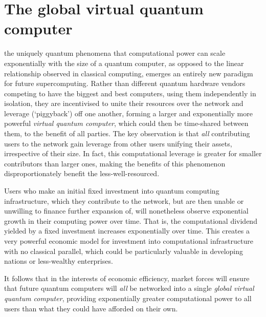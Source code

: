 \section{The global virtual quantum computer} \label{sec:GVQC} 

\newline

 the uniquely quantum phenomena that computational power can scale exponentially with the size of a quantum computer, as opposed to the linear relationship observed in classical computing, emerges an entirely new paradigm for future supercomputing. Rather than different quantum hardware vendors competing to have the biggest and best computers, using them independently in isolation, they are incentivised to unite their resources over the network and leverage (`piggyback') off one another, forming a larger and exponentially more powerful \textit{virtual quantum computer}, which could then be time-shared between them, to the benefit of all parties. The key observation is that \textit{all} contributing users to the network gain leverage from other users unifying their assets, irrespective of their size. In fact, this computational leverage is greater for smaller contributors than larger ones, making the benefits of this phenomenon disproportionately benefit the less-well-resourced.

Users who make an initial fixed investment into quantum computing infrastructure, which they contribute to the network, but are then unable or unwilling to finance further expansion of, will nonetheless observe exponential growth in their computing power over time. That is, the computational dividend yielded by a fixed investment increases exponentially over time. This creates a very powerful economic model for investment into computational infrastructure with no classical parallel, which could be particularly valuable in developing nations or less-wealthy enterprises.

It follows that in the interests of economic efficiency, market forces will ensure that future quantum computers will \textit{all} be networked into a single \textit{global virtual quantum computer}, providing exponentially greater computational power to all users than what they could have afforded on their own.

